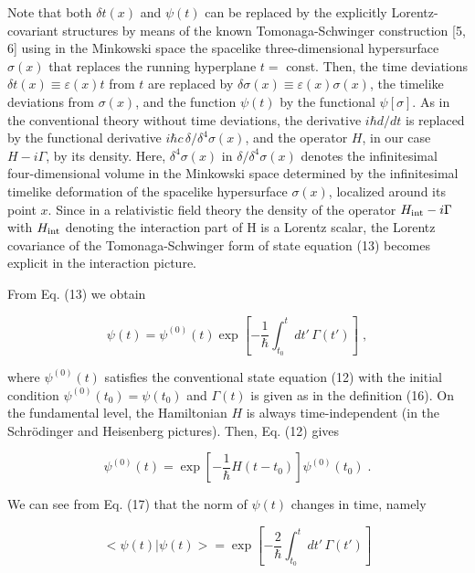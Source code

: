 \documentclass[a4paper,12pt]{article}
\begin{document}
Note that both $\delta t(x)$ and $\psi (t)$ can be replaced by the explicitly Lorentz-covariant structures by means of the known Tomonaga-Schwinger construction [5, 6] using in the Minkowski space the spacelike three-dimensional hypersurface $\sigma (x)$ that replaces the running hyperplane $t =$ const. Then, the time deviations $\delta t(x) \equiv \varepsilon (x) t$ from $t$ are replaced by $\delta \sigma(x) \equiv \varepsilon (x) \sigma(x)$, the timelike deviations from $\sigma(x)$, and the function $\psi(t)$ by the functional $\psi[\sigma]$. As in the conventional theory without time deviations, the derivative $i \hbar d/dt $ is replaced by the functional derivative $i \hbar c\, \delta/\delta^4 \sigma(x)$, and the operator $H$, in our case $H - i \Gamma$, by its density. Here, $\delta^4 \sigma(x)$ in $\delta/\delta^4 \sigma(x)$ denotes the infinitesimal four-dimensional volume in the Minkowski space determined by the infinitesimal timelike deformation of the spacelike hypersurface $\sigma(x)$, localized around its point $x$. Since in a relativistic field theory the density of the operator $H_{\rm int} - i \Gamma $ with $H_{\rm int}$ denoting the interaction part of H is a Lorentz scalar, the Lorentz covariance of the Tomonaga-Schwinger form of state equation (13) becomes explicit in the interaction picture.

From Eq. (13) we obtain

\begin{equation}
\psi(t) = \psi^{(0)}(t) \exp\left[ -\frac{1}{\hbar} \int^t_{t_0} dt'\, \Gamma(t')\right] \;,
\end{equation}

\ni where $ \psi^{(0)}(t)$ satisfies the conventional state equation (12) with the initial condition  $ \psi^{(0)}(t_0) =  \psi(t_0)$ and $\Gamma(t)$ is given as in the definition (16). On the fundamental level, the Hamiltonian $H$ is always time-independent (in the Schr\"{o}dinger and  Heisenberg pictures). Then, Eq. (12) gives

\begin{equation}
\psi^{(0)}(t) = \exp\left[ -\frac{1}{\hbar} H(t - t_0)\right] \psi^{(0)}(t_0)\;.
\end{equation}

\ni We can see from Eq. (17) that the norm of $\psi(t)$ changes in time, namely

\begin{equation}
<\psi(t)|\psi(t)> = \exp\left[ -\frac{2}{\hbar} \int^t_{t_0} dt'\, \Gamma(t')\right]
\end{equation}
\end{document}
